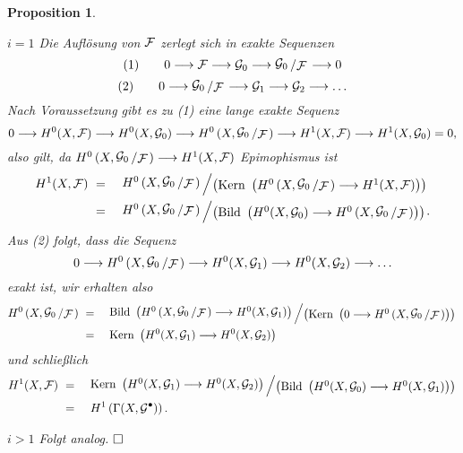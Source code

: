 \documentclass[11pt]{book}
\newtheorem{proposition}[theorem]{Proposition}
\theoremstyle{nonumberbreak}
\newenvironment{pr}[1][]{\ifthenelse{\equal{#1}{}}{\proof}{\proof[#1]}\rm}{\endproof}
\newcommand{\bild}{\mathrm{Bild}\ }
\newcommand{\kernel}{\mathrm{Kern}\ }
\newcommand{\slant}[2]{{\raisebox{.1em}{$#1$}\left/\raisebox{-.1em}{$#2$}\right.}}
\begin{document}
\begin{spacing}{1.4}
\begin{proposition}
\begin{pr}
\begin{compactenum}
\item[$i=1$] Die Auflösung von $\mathcal{F}$ zerlegt sich in exakte Sequenzen 
$$(1) \qquad 0 \la \F \la \G_0 \la \slant{\G_0}{\F} \la 0$$
$$(2) \qquad 0 \la \slant{\G_0}{\F} \la \G_1 \la \G_2 \la \ldots$$
Nach Voraussetzung gibt es zu (1) eine lange exakte Sequenz
$$0 \la H^{0}(X, \F) \la H^{0}(X, \G_0) \la H^{0}\left(X, \slant{\G_0}{\F}\right) \la H^{1}(X, \F) \la H^{1}(X, \G_0) = 0,$$
also gilt, da $H^{0}\left(X, \slant{\G_0}{\F}\right) \la H^{1}(X, \F)$ Epimophismus ist
\setlength{\abovedisplayskip}{5.5pt}
\setlength{\belowdisplayskip}{5.5pt}
\begin{alignat*}{5}
H^{1}(X, \F) \ &=&& \ \slant{H^{0}\left(X, \slant{\G_0}{\F}\right)}{\left(\kernel\left( H^{0}\left(X, \slant{\G_0}{\F}\right) \la H^{1}(X, \F)\right)\right)}\\
&=&& \ \slant{H^{0}\left(X, \slant{\G_0}{\F}\right)}{\left(\bild\left( H^{0}(X, \G_0) \la H^{0}\left(X, \slant{\G_0}{\F}\right)\right)\right)}.
\end{alignat*}
Aus (2) folgt, dass die Sequenz
$$0 \la H^{0}\left(X, \slant{\G_0}{\F}\right) \la H^{0}(X, \G_1) \la H^{0}(X, \G_2) \longrightarrow \ldots$$
exakt ist, wir erhalten also
\setlength{\abovedisplayskip}{5.5pt}
\setlength{\belowdisplayskip}{5.5pt}
\begin{alignat*}{5}
H^{0}\left(X, \slant{\G_0}{\F}\right) \ &=&& \ \slant{\bild \left( H^{0}\left(X, \slant{\G_0}{\F}\right) \la H^{0}(X, \G_1) \right)}{\left( \kernel \left(0 \la H^{0}\left(X, \slant{\G_0}{\F}\right)\right) \right)} \\
&=&& \ \kernel \left( H^{0}(X, \G_1) \la H^{0}(X, \G_2) \right)
\end{alignat*}
und schließlich
\setlength{\abovedisplayskip}{5.5pt}
\setlength{\belowdisplayskip}{5.5pt}
\begin{alignat*}{5}
H^{1}(X, \F) \ &=&& \ \slant{ \kernel \left( H^{0}(X, \G_1) \la H^{0}(X, \G_2) \right)}{\left( \bild \left( H^{0}(X, \G_0) \la H^{0}(X, \G_1) \right) \right)} \\
&=&& \ H^{1}\left( \Gamma(X, \G^{\bullet}) \right).
\end{alignat*}
\item[$i>1$] Folgt analog. $\hfill \Box$



\end{compactenum}
\end{pr}
\end{proposition}



\end{spacing}
\end{document}
